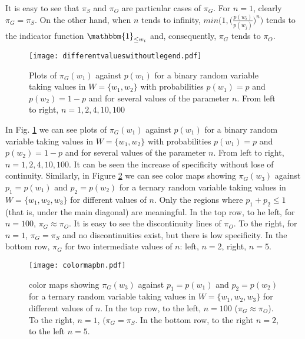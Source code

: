 \documentclass[a4paper]{article}
\begin{document}
It is easy to see that $\pi_S$ and $\pi_O$ are particular cases of $\pi_G$. For $n=1$, clearly $\pi_G=\pi_S$. On the other hand, when $n$ tends to infinity, $min\big(1,\big( \frac{p(w_i)}{p(w_j)} \big)^n \big)$ tends to the indicator function $\mathbbm{1}_{\leq w_i}$ and, consequently, $\pi_G$ tends to $\pi_O$. 
\begin{figure}
\centering
\texttt{[image: differentvalueswithoutlegend.pdf]}
\caption{\label{fig:generalized}Plots of $\pi_G(w_1)$ against $p(w_1)$ for a binary random variable taking values in $W=\{w_1,w_2\}$ with probabilities $p(w_1)=p$ and $p(w_2)=1-p$ and for several values of the parameter $n$. From left to right, $n=1,2,4,10,100$}
\end{figure}

In Fig. \ref{fig:generalized} we can see plots of $\pi_G(w_1)$ against $p(w_1)$ for a binary random variable taking values in $W=\{w_1,w_2\}$ with probabilities $p(w_1)=p$ and $p(w_2)=1-p$ and for several values of the parameter $n$. From left to right, $n=1,2,4,10,100$. It can be seen the increase of specificity without lose of continuity. Similarly, in Figure \ref{fig:colormaps} we can see color maps showing $\pi_G(w_3)$ against $p_1=p(w_1)$ and $p_2=p(w_2)$ for a ternary random variable taking values in $W=\{w_1,w_2,w_3\}$ for different values of $n$. Only the regions where $p_1 + p_2 \leq 1$ (that is, under the main diagonal) are meaningful. In the top row, to he left, for $n=100$,  $\pi_G \approx \pi_O$. It is easy to see the discontinuity lines of $\pi_O$. To the right, for $n=1$, $\pi_G=\pi_S$ and no discontinuities exist, but there is low specificity. In the bottom row, $\pi_G$ for two intermediate values of $n$: left, $n=2$, right, $n=5$.
\begin{figure}
\centering
\texttt{[image: colormapbn.pdf]}
\caption{\label{fig:colormaps}color maps showing $\pi_G(w_3)$ against $p_1=p(w_1)$ and $p_2=p(w_2)$ for a ternary random variable taking values in $W=\{w_1,w_2,w_3\}$ for different values of $n$. In the top row, to the left, $n=100$ ($\pi_G \approx \pi_O$). To the right, $n=1$, $(\pi_G=\pi_S$. In the bottom row,  to the right $n=2$, to the left $n=5$.}
\end{figure}
\end{document}
